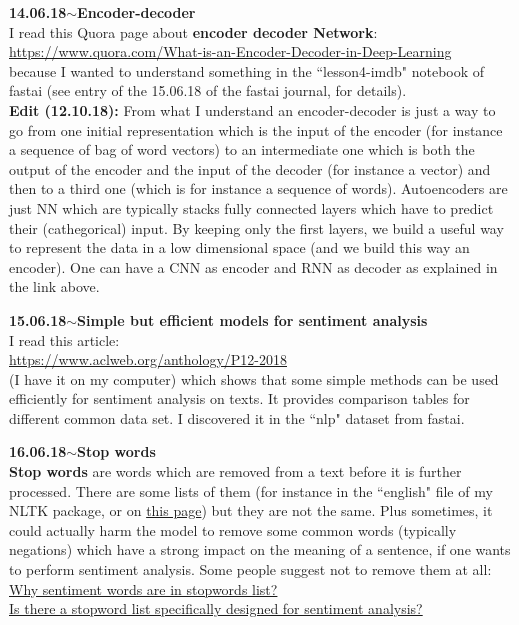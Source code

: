 \documentclass[11pt,a4paper]{article}
\newenvironment{loggentry}[2]%
{\noindent\textbf{#1}\hspace{1cm}$\mathbf{\sim}$\text{ }\textbf{#2}\\}{\vspace{0.5cm}}
\begin{document}
\begin{loggentry}{14.06.18}{Encoder-decoder}

I read this Quora page about \textbf{encoder decoder Network}:\\
\url{https://www.quora.com/What-is-an-Encoder-Decoder-in-Deep-Learning}\\
because I wanted to understand something in the ``lesson4-imdb" notebook of fastai (see entry of the 15.06.18 of the fastai journal, for details).\\
\textbf{Edit (12.10.18):} From what I understand an encoder-decoder is just a way to go from one initial representation which is the input of the encoder (for instance a sequence of bag of word vectors) to an intermediate one which is both the output of the encoder and the input of the decoder (for instance a vector) and then to a third one (which is for instance a sequence of words). Autoencoders are just NN which are typically stacks fully connected layers which have to predict their (cathegorical) input. By keeping only the first layers, we build a useful way to represent the data in a low dimensional space (and we build this way an encoder). One can have a CNN as encoder and RNN as decoder as explained in the link above.\\

\end{loggentry}

\begin{loggentry}{15.06.18}{Simple but efficient models for sentiment analysis}
I read this article:\\
\url{https://www.aclweb.org/anthology/P12-2018}\\
(I have it on my computer) which shows that some simple methods can be used efficiently for sentiment analysis on texts. It provides comparison tables for different common data set. I discovered it in the ``nlp" dataset from fastai.
\end{loggentry}

\begin{loggentry}{16.06.18}{Stop words}
\textbf{Stop words} are words which are removed from a text before it is further processed. There are some lists of them (for instance in the ``english" file of my NLTK package, or on \href{https://github.com/scikit-learn/scikit-learn/blob/a24c8b464d094d2c468a16ea9f8bf8d42d949f84/sklearn/feature_extraction/stop_words.py}{this page}) but they are not the same. Plus sometimes, it could actually harm the model to remove some common words (typically negations) which have a strong impact on the meaning of a sentence, if one wants to perform sentiment analysis. Some people suggest not to remove them at all:\\
\href{https://www.quora.com/Why-sentiment-words-are-in-stopwords-list}{Why sentiment words are in stopwords list?}\\
\href{https://www.quora.com/Is-there-a-stop-word-list-specifically-designed-for-sentiment-analysis}{Is there a stopword list specifically designed for sentiment analysis?}\\
\end{loggentry}
\end{document}
